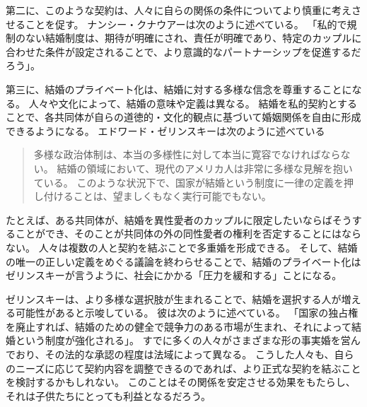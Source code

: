 \documentclass[paper=a4,book,openany]{jlreq}
\begin{document}
第二に、このような契約は、人々に自らの関係の条件についてより慎重に考えさせることを促す。
ナンシー・クナウアーは次のように述べている。
「私的で規制のない結婚制度は、期待が明確にされ、責任が明確であり、特定のカップルに合わせた条件が設定されることで、より意識的なパートナーシップを促進するだろう」\citep[p.103]{knauer06:_marriag_skept_respon_pro_marriag}。

第三に、結婚のプライベート化は、結婚に対する多様な信念を尊重することになる。
人々や文化によって、結婚の意味や定義は異なる。
結婚を私的契約とすることで、各共同体が自らの道徳的・文化的観点に基づいて婚姻関係を自由に形成できるようになる。
エドワード・ゼリンスキーは次のように述べている

\begin{quote}
多様な政治体制は、本当の多様性に対して本当に寛容でなければならない。
結婚の領域において、現代のアメリカ人は非常に多様な見解を抱いている。
このような状況下で、国家が結婚という制度に一律の定義を押し付けることは、望ましくもなく実行可能でもない。
\citep{zelinsky08:_marriag}
\end{quote}

たとえば、ある共同体が、結婚を異性愛者のカップルに限定したいならばそうすることができ、そのことが共同体の外の同性愛者の権利を否定することにはならない。
人々は複数の人と契約を結ぶことで多重婚を形成できる。
そして、結婚の唯一の正しい定義をめぐる議論を終わらせることで、結婚のプライベート化はゼリンスキーが言うように、社会にかかる「圧力を緩和する」ことになる\citep[pp. 1178--1179]{zelinsky06:_dereg_marriag}。

ゼリンスキーは、より多様な選択肢が生まれることで、結婚を選択する人が増える可能性があると示唆している。
彼は次のように述べている。
「国家の独占権を廃止すれば、結婚のための健全で競争力のある市場が生まれ、それによって結婚という制度が強化される」\citep[p.1164]{zelinsky06:_dereg_marriag}。
すでに多くの人々がさまざまな形の事実婚を営んでおり、その法的な承認の程度は法域によって異なる。
こうした人々も、自らのニーズに応じて契約内容を調整できるのであれば、より正式な契約を結ぶことを検討するかもしれない。
このことはその関係を安定させる効果をもたらし、それは子供たちにとっても利益となるだろう。
\end{document}
